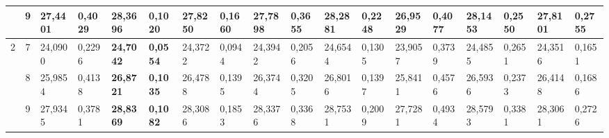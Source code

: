 \documentclass[conference]{IEEEtran}
\begin{document}
\begin{table*}[]
\begin{tabular}{|cc|ll|ll|ll|ll|ll|ll|ll|ll|}
		\multicolumn{1}{|c|}{}                    & 9          & \multicolumn{1}{l|}{27,4401}           & 0,4029                            & \multicolumn{1}{l|}{\textbf{28,3696}}  & \textbf{0,1020}                   & \multicolumn{1}{l|}{27,8250}           & 0,1660                            & \multicolumn{1}{l|}{27,7898}           & 0,3655                            & \multicolumn{1}{l|}{28,2881}           & 0,2248                            & \multicolumn{1}{l|}{26,9529}           & 0,4077                            & \multicolumn{1}{l|}{28,1453}           & 0,2550                            & \multicolumn{1}{l|}{27,8101}           & 0,2755                            \\ \hline
		\multicolumn{1}{|c|}{\multirow{3}{*}{2}}  & 7          & \multicolumn{1}{l|}{24,0900}           & 0,2296                            & \multicolumn{1}{l|}{\textbf{24,7042}}  & \textbf{0,0554}                   & \multicolumn{1}{l|}{24,3722}           & 0,0944                            & \multicolumn{1}{l|}{24,3942}           & 0,2056                            & \multicolumn{1}{l|}{24,6544}           & 0,1305                            & \multicolumn{1}{l|}{23,9057}           & 0,3739                            & \multicolumn{1}{l|}{24,4855}           & 0,2651                            & \multicolumn{1}{l|}{24,3516}           & 0,1651                            \\ \cline{2-18} 
		\multicolumn{1}{|c|}{}                    & 8          & \multicolumn{1}{l|}{25,9854}           & 0,4138                            & \multicolumn{1}{l|}{\textbf{26,8721}}  & \textbf{0,1035}                   & \multicolumn{1}{l|}{26,4788}           & 0,1395                            & \multicolumn{1}{l|}{26,3744}           & 0,3205                            & \multicolumn{1}{l|}{26,8016}           & 0,1397                            & \multicolumn{1}{l|}{25,8411}           & 0,4576                            & \multicolumn{1}{l|}{26,5936}           & 0,2373                            & \multicolumn{1}{l|}{26,4148}           & 0,1686                            \\ \cline{2-18} 
		\multicolumn{1}{|c|}{}                    & 9          & \multicolumn{1}{l|}{27,9345}           & 0,3781                            & \multicolumn{1}{l|}{\textbf{28,8369}}  & \textbf{0,1082}                   & \multicolumn{1}{l|}{28,3086}           & 0,1853                            & \multicolumn{1}{l|}{28,3376}           & 0,3368                            & \multicolumn{1}{l|}{28,7531}           & 0,2009                            & \multicolumn{1}{l|}{27,7281}           & 0,4934                            & \multicolumn{1}{l|}{28,5793}           & 0,3381                            & \multicolumn{1}{l|}{28,3061}           & 0,2726                            \\ \hline

\end{tabular}
\end{table*}
\end{document}
